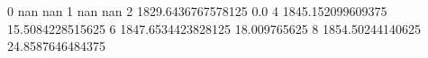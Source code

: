 0 nan nan
1 nan nan
2 1829.6436767578125 0.0
4 1845.152099609375 15.5084228515625
6 1847.6534423828125 18.009765625
8 1854.50244140625 24.8587646484375

